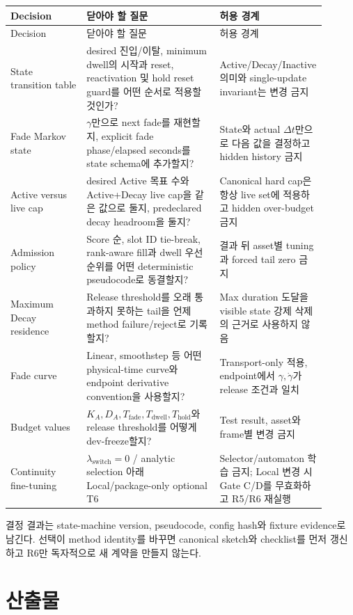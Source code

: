 \documentclass[10pt]{article}
\begin{document}
\begin{longtable}{L{0.24\linewidth}L{0.42\linewidth}L{0.24\linewidth}}
\toprule
Decision & 닫아야 할 질문 & 허용 경계\\
\midrule
\endfirsthead
\toprule
Decision & 닫아야 할 질문 & 허용 경계\\
\midrule
\endhead
State transition table & desired 진입/이탈, minimum dwell의 시작과 reset, reactivation 및 hold reset guard를 어떤 순서로 적용할 것인가? & Active/Decay/Inactive 의미와 single-update invariant는 변경 금지\\
Fade Markov state & \(\gamma\)만으로 next fade를 재현할지, explicit fade phase/elapsed seconds를 state schema에 추가할지? & State와 actual \(\Delta t\)만으로 다음 값을 결정하고 hidden history 금지\\
Active versus live cap & desired Active 목표 수와 Active+Decay live cap을 같은 값으로 둘지, predeclared decay headroom을 둘지? & Canonical hard cap은 항상 live set에 적용하고 hidden over-budget 금지\\
Admission policy & Score 순, slot ID tie-break, rank-aware fill과 dwell 우선순위를 어떤 deterministic pseudocode로 동결할지? & 결과 뒤 asset별 tuning과 forced tail zero 금지\\
Maximum Decay residence & Release threshold를 오래 통과하지 못하는 tail을 언제 method failure/reject로 기록할지? & Max duration 도달을 visible state 강제 삭제의 근거로 사용하지 않음\\
Fade curve & Linear, smoothstep 등 어떤 physical-time curve와 endpoint derivative convention을 사용할지? & Transport-only 적용, endpoint에서 \(\gamma,\dot\gamma\)가 release 조건과 일치\\
Budget values & \(K_A,D_A,T_{\mathrm{fade}},T_{\mathrm{dwell}},T_{\mathrm{hold}}\)와 release threshold를 어떻게 dev-freeze할지? & Test result, asset와 frame별 변경 금지\\
Continuity fine-tuning & \(\lambda_{\mathrm{switch}}=0\) / analytic selection 아래 Local/package-only optional T6 & Selector/automaton 학습 금지; Local 변경 시 Gate C/D를 무효화하고 R5/R6 재실행\\
\bottomrule
\end{longtable}

결정 결과는 state-machine version, pseudocode, config hash와 fixture evidence로 남긴다. 선택이 method identity를
바꾸면 canonical sketch와 checklist를 먼저 갱신하고 R6만 독자적으로 새 계약을 만들지 않는다.

\section{산출물}
\label{sec:r6-chapter-6}
\end{document}
